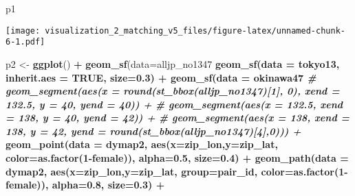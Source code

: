 \documentclass[
]{article}
\newenvironment{Shaded}{\begin{snugshade}}{\end{snugshade}}
\newcommand{\CommentTok}[1]{\textcolor[rgb]{0.56,0.35,0.01}{\textit{#1}}}
\newcommand{\DataTypeTok}[1]{\textcolor[rgb]{0.13,0.29,0.53}{#1}}
\newcommand{\DecValTok}[1]{\textcolor[rgb]{0.00,0.00,0.81}{#1}}
\newcommand{\FloatTok}[1]{\textcolor[rgb]{0.00,0.00,0.81}{#1}}
\newcommand{\KeywordTok}[1]{\textcolor[rgb]{0.13,0.29,0.53}{\textbf{#1}}}
\newcommand{\NormalTok}[1]{#1}
\newcommand{\OperatorTok}[1]{\textcolor[rgb]{0.81,0.36,0.00}{\textbf{#1}}}
\newcommand{\OtherTok}[1]{\textcolor[rgb]{0.56,0.35,0.01}{#1}}
\newcommand{\StringTok}[1]{\textcolor[rgb]{0.31,0.60,0.02}{#1}}
\begin{document}
\begin{Shaded}
\begin{Highlighting}[]
\NormalTok{p1}
\end{Highlighting}
\end{Shaded}

\texttt{[image: visualization\_2\_matching\_v5\_files/figure-latex/unnamed-chunk-6-1.pdf]}

\begin{Shaded}
\begin{Highlighting}[]
\NormalTok{p2 <-}\StringTok{ }\KeywordTok{ggplot}\NormalTok{() }\OperatorTok{+}\StringTok{ }
\StringTok{  }\KeywordTok{geom_sf}\NormalTok{(}\DataTypeTok{data=}\NormalTok{alljp_no1347 }\OperatorTok{%>%}\StringTok{ }\KeywordTok{st_simplify}\NormalTok{(}\DataTypeTok{dTolerance =} \FloatTok{0.01}\NormalTok{), }\DataTypeTok{size=}\FloatTok{0.3}\NormalTok{) }\OperatorTok{+}\StringTok{ }
\StringTok{  }\KeywordTok{geom_sf}\NormalTok{(}\DataTypeTok{data =}\NormalTok{ tokyo13, }\DataTypeTok{inherit.aes =} \OtherTok{TRUE}\NormalTok{, }\DataTypeTok{size=}\FloatTok{0.3}\NormalTok{) }\OperatorTok{+}\StringTok{ }
\StringTok{  }\KeywordTok{geom_sf}\NormalTok{(}\DataTypeTok{data =}\NormalTok{ okinawa47 }\OperatorTok{%>%}\StringTok{ }\KeywordTok{st_simplify}\NormalTok{(}\DataTypeTok{dTolerance =} \FloatTok{0.01}\NormalTok{), }\DataTypeTok{inherit.aes =} \OtherTok{TRUE}\NormalTok{, }\DataTypeTok{size=}\FloatTok{0.3}\NormalTok{) }\OperatorTok{+}\StringTok{   }
\StringTok{  }\CommentTok{# geom_segment(aes(x = round(st_bbox(alljp_no1347)[1], 0), xend = 132.5, y = 40, yend = 40)) + }
\StringTok{  }\CommentTok{# geom_segment(aes(x = 132.5, xend = 138, y = 40, yend = 42)) + }
\StringTok{  }\CommentTok{# geom_segment(aes(x = 138, xend = 138, y = 42, yend = round(st_bbox(alljp_no1347)[4],0))) + }
\StringTok{  }\KeywordTok{geom_point}\NormalTok{(}\DataTypeTok{data =}\NormalTok{ dymap2, }\KeywordTok{aes}\NormalTok{(}\DataTypeTok{x=}\NormalTok{zip_lon,}\DataTypeTok{y=}\NormalTok{zip_lat, }\DataTypeTok{color=}\KeywordTok{as.factor}\NormalTok{(}\DecValTok{1}\OperatorTok{-}\NormalTok{female)), }\DataTypeTok{alpha=}\FloatTok{0.5}\NormalTok{, }\DataTypeTok{size=}\FloatTok{0.4}\NormalTok{) }\OperatorTok{+}\StringTok{ }
\StringTok{  }\KeywordTok{geom_path}\NormalTok{(}\DataTypeTok{data =}\NormalTok{ dymap2, }\KeywordTok{aes}\NormalTok{(}\DataTypeTok{x=}\NormalTok{zip_lon,}\DataTypeTok{y=}\NormalTok{zip_lat, }\DataTypeTok{group=}\NormalTok{pair_id, }\DataTypeTok{color=}\KeywordTok{as.factor}\NormalTok{(}\DecValTok{1}\OperatorTok{-}\NormalTok{female)), }\DataTypeTok{alpha=}\FloatTok{0.8}\NormalTok{, }\DataTypeTok{size=}\FloatTok{0.3}\NormalTok{) }\OperatorTok{+}\StringTok{ }
}}
\end{Highlighting}
\end{Shaded}
\end{document}
